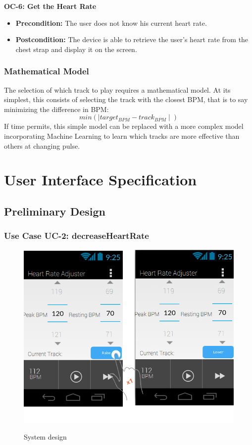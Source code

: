 \documentclass[letterpaper,english, 12pt]{scrreprt}
\begin{document}
{\bf OC-6: Get the Heart Rate}
\begin{itemize}
	\item {\bf Precondition: } The user does not know his current heart rate.
	\item {\bf Postcondition: } The device is able to retrieve the user's heart rate from the chest strap and display it on the screen.
\end{itemize}

\subsection{Mathematical Model}
The selection of which track to play requires a mathematical model. At its simplest, this consists of selecting the track with the closest BPM, that is to say minimizing the difference in BPM:
\begin{equation}
  min(\mid target_{BPM} - track_{BPM} \mid)
\end{equation}
If time permits, this simple model can be replaced with a more complex model incorporating Machine Learning to learn which tracks are more effective than others at changing pulse.

\chapter{User Interface Specification}
\section{Preliminary Design}

\subsection{Use Case UC-2: decreaseHeartRate}

\begin{figure}[H]
	\centering
	\includegraphics{img/Prelim_Design/PrelimDesign_1.png}\\
	\caption{System design}
\end{figure}
\end{document}
